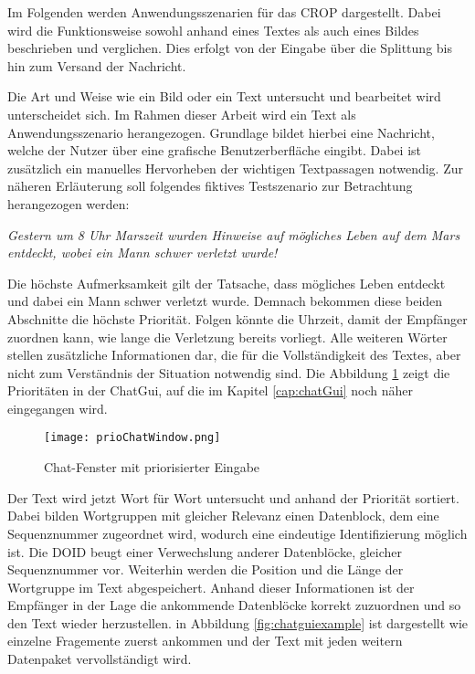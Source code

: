 \label{sec:Anwendungsszenarien}

Im Folgenden werden Anwendungsszenarien für das \gls{CROP} dargestellt. Dabei
wird die Funktionsweise sowohl anhand eines Textes als auch eines Bildes beschrieben und
verglichen. Dies erfolgt von der Eingabe über die Splittung bis hin zum Versand
der Nachricht.

Die Art und Weise wie ein Bild oder ein Text untersucht und bearbeitet wird
unterscheidet sich. Im Rahmen dieser Arbeit wird ein Text als
Anwendungsszenario herangezogen. Grundlage bildet hierbei eine Nachricht,
welche der Nutzer über eine grafische Benutzerberfläche eingibt.
Dabei ist zusätzlich ein manuelles Hervorheben der wichtigen Textpassagen
notwendig. Zur näheren Erläuterung soll folgendes fiktives Testszenario zur
Betrachtung herangezogen werden:

\textit{\glqq Gestern um 8 Uhr Marszeit wurden Hinweise auf mögliches Leben auf
dem Mars entdeckt, wobei ein Mann schwer verletzt wurde! \grqq}

Die höchste Aufmerksamkeit gilt der Tatsache, dass mögliches Leben entdeckt und
dabei ein Mann schwer verletzt wurde. Demnach bekommen diese beiden Abschnitte
die höchste Priorität. Folgen könnte die Uhrzeit, damit der Empfänger zuordnen
kann, wie lange die Verletzung bereits vorliegt. Alle weiteren Wörter stellen
zusätzliche Informationen dar, die für die Vollständigkeit des Textes, aber
nicht zum Verständnis der Situation notwendig sind. Die Abbildung
\ref{fig:prioChatWindow} zeigt die Prioritäten in der ChatGui, auf die im
Kapitel \ref{cap:chatGui} noch näher eingegangen wird.

\begin{figure}[H]
	\centering
	\texttt{[image: prioChatWindow.png]}
	\label{fig:prioChatWindow}
	\caption{Chat-Fenster mit priorisierter Eingabe}
\end{figure}

Der Text wird jetzt Wort für Wort untersucht und anhand der Priorität sortiert.
Dabei bilden Wortgruppen mit gleicher Relevanz einen Datenblock, dem eine
Sequenznummer zugeordnet wird, wodurch eine eindeutige Identifizierung möglich
ist. Die \gls{DOID} beugt einer Verwechslung anderer Datenblöcke, gleicher
Sequenznummer vor. Weiterhin werden die Position und die Länge der Wortgruppe im
Text abgespeichert. Anhand dieser Informationen ist der Empfänger in der Lage
die ankommende Datenblöcke korrekt zuzuordnen und so den Text wieder herzustellen.
in Abbildung \ref{fig:chatguiexample} ist dargestellt wie einzelne Fragemente
zuerst ankommen und der Text mit jeden weitern Datenpaket vervollständigt wird.

